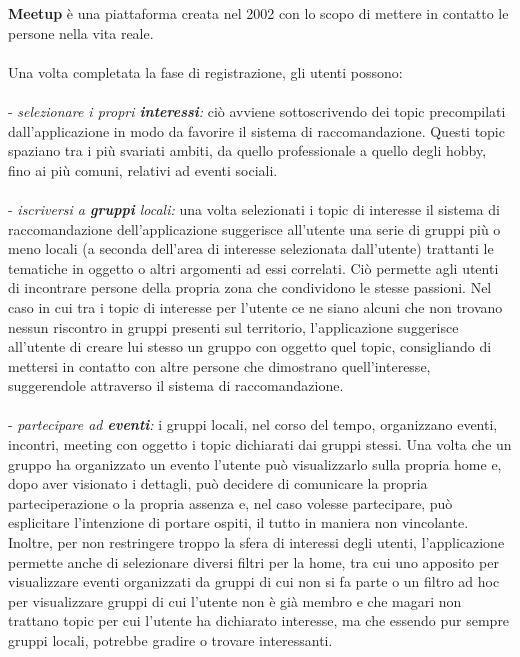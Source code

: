 \documentclass[fleqn,10pt]{SelfArx} %
\begin{document}
{\small %
\textbf{Meetup} è una piattaforma creata nel 2002 con lo scopo di mettere in contatto le persone nella vita reale.\\
\\
Una volta completata la fase di registrazione, gli utenti possono: \\
\\
- \textit{selezionare i propri \textbf{interessi}:} ciò avviene sottoscrivendo dei topic precompilati dall'applicazione in modo da favorire il sistema di raccomandazione. 
Questi topic spaziano tra i più svariati ambiti, da quello professionale a quello degli hobby, fino ai più comuni, relativi ad eventi sociali. \\
\\
- \textit{iscriversi a \textbf{gruppi} locali:} una volta selezionati i topic di interesse il sistema di raccomandazione dell'applicazione suggerisce all'utente una serie di gruppi più o meno locali (a seconda dell'area di interesse selezionata dall'utente) trattanti le tematiche in oggetto o altri argomenti ad essi correlati. 
Ciò permette agli utenti di incontrare persone della propria zona che condividono le stesse passioni. 
Nel caso in cui tra i topic di interesse per l'utente ce ne siano alcuni che non trovano nessun riscontro in gruppi presenti sul territorio, l'applicazione suggerisce all'utente di creare lui stesso un gruppo con oggetto quel topic, consigliando di mettersi in contatto con altre persone che dimostrano quell'interesse, suggerendole attraverso il sistema di raccomandazione.\\
\\
- \textit{partecipare ad \textbf{eventi}:} i gruppi locali, nel corso del tempo, organizzano eventi, incontri, meeting con oggetto i topic dichiarati dai gruppi stessi. 
Una volta che un gruppo ha organizzato un evento l'utente può visualizzarlo sulla propria home e, dopo aver visionato i dettagli, può decidere di comunicare la propria parteciperazione o la propria assenza e, nel caso volesse partecipare, può esplicitare l'intenzione di portare ospiti, il tutto in maniera non vincolante. 
Inoltre, per non restringere troppo la sfera di interessi degli utenti, l'applicazione permette anche di selezionare diversi filtri per la home, tra cui uno apposito per visualizzare eventi organizzati da gruppi di cui non si fa parte o un filtro ad hoc per visualizzare gruppi di cui l'utente non è già membro e che magari non trattano topic per cui l'utente ha dichiarato interesse, ma che essendo pur sempre gruppi locali, potrebbe gradire o trovare interessanti.\\
}
\end{document}
